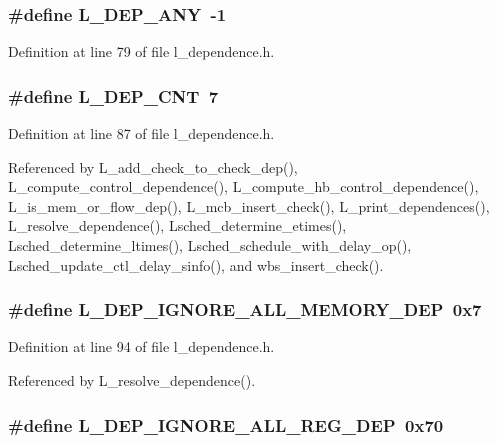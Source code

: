\subsubsection{\setlength{\rightskip}{0pt plus 5cm}\#define L\_\-DEP\_\-ANY~-1}\label{l__dependence_8h_3744ed9cb461fa1557d895e4b84fcbbe}




Definition at line 79 of file l\_\-dependence.h.
\subsubsection{\setlength{\rightskip}{0pt plus 5cm}\#define L\_\-DEP\_\-CNT~7}\label{l__dependence_8h_97a696524ddcfcf52e99447d6ab90987}




Definition at line 87 of file l\_\-dependence.h.

Referenced by L\_\-add\_\-check\_\-to\_\-check\_\-dep(), L\_\-compute\_\-control\_\-dependence(), L\_\-compute\_\-hb\_\-control\_\-dependence(), L\_\-is\_\-mem\_\-or\_\-flow\_\-dep(), L\_\-mcb\_\-insert\_\-check(), L\_\-print\_\-dependences(), L\_\-resolve\_\-dependence(), Lsched\_\-determine\_\-etimes(), Lsched\_\-determine\_\-ltimes(), Lsched\_\-schedule\_\-with\_\-delay\_\-op(), Lsched\_\-update\_\-ctl\_\-delay\_\-sinfo(), and wbs\_\-insert\_\-check().
\subsubsection{\setlength{\rightskip}{0pt plus 5cm}\#define L\_\-DEP\_\-IGNORE\_\-ALL\_\-MEMORY\_\-DEP~0x7}\label{l__dependence_8h_59849a68b770fbb0c4cc1b8a2161a34d}




Definition at line 94 of file l\_\-dependence.h.

Referenced by L\_\-resolve\_\-dependence().
\subsubsection{\setlength{\rightskip}{0pt plus 5cm}\#define L\_\-DEP\_\-IGNORE\_\-ALL\_\-REG\_\-DEP~0x70}\label{l__dependence_8h_c320f7b14c2e5027a2778e774364019f}




